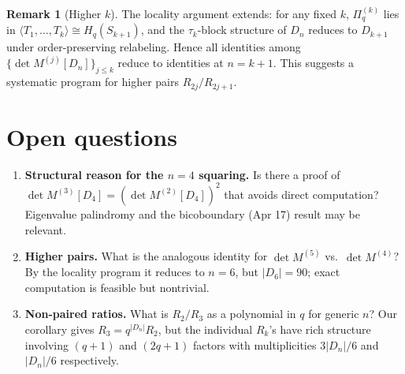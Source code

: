 \documentclass[11pt]{article}
\theoremstyle{definition}
\newtheorem{remark}[theorem]{Remark}
\begin{document}
\begin{remark}[Higher $k$]
The locality argument extends: for any fixed $k$, $\Pi^{(k)}_q$ lies in
$\langle T_1, \ldots, T_k \rangle \cong H_q(S_{k+1})$, and the $\tau_k$-block structure
of $D_n$ reduces to $D_{k+1}$ under order-preserving relabeling. Hence all identities
among $\{\det M^{(j)}[D_n]\}_{j \leq k}$ reduce to identities at $n = k+1$. This suggests
a systematic program for higher pairs $R_{2j}/R_{2j+1}$.
\end{remark}

\section{Open questions}
\label{sec:open}

\begin{enumerate}
\item \textbf{Structural reason for the $n=4$ squaring.} Is there a proof of
$\det M^{(3)}[D_4] = (\det M^{(2)}[D_4])^2$ that avoids direct computation?
Eigenvalue palindromy and the bicoboundary (Apr 17) result may be relevant.
\item \textbf{Higher pairs.} What is the analogous identity for $\det M^{(5)}$ vs.\
$\det M^{(4)}$? By the locality program it reduces to $n = 6$, but $|D_6| = 90$;
exact computation is feasible but nontrivial.
\item \textbf{Non-paired ratios.} What is $R_2/R_3$ as a polynomial in $q$ for
generic $n$? Our corollary gives $R_3 = q^{|D_n|} R_2$, but the individual $R_k$'s
have rich structure involving $(q+1)$ and $(2q+1)$ factors with multiplicities
$3 |D_n|/6$ and $|D_n|/6$ respectively.
\end{enumerate}
\end{document}
